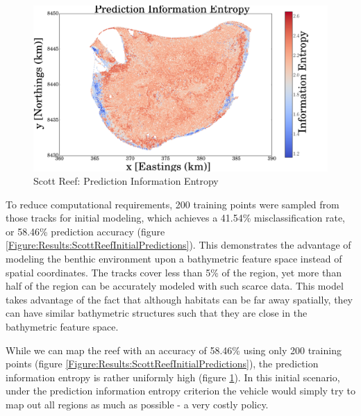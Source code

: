 \documentclass{article}
\begin{document}
		\begin{figure}[bp]
		\centering
			\includegraphics[width = \linewidth]{Figures/scott_reef_modeling/Figure9-eps-converted-to.png}
		\caption{Scott Reef: Prediction Information Entropy}
		\label{Figure:Results:ScottReefPredictionInformationEntropy}
		\end{figure}
				
		To reduce computational requirements, 200 training points were sampled from those tracks for initial modeling, which achieves a 41.54\% misclassification rate, or 58.46\% prediction accuracy (figure \ref{Figure:Results:ScottReefInitialPredictions}). This demonstrates the advantage of modeling the benthic environment upon a bathymetric feature space instead of spatial coordinates. The tracks cover less than 5\% of the region, yet more than half of the region can be accurately modeled with such scarce data. This model takes advantage of the fact that although habitats can be far away spatially, they can have similar bathymetric structures such that they are close in the bathymetric feature space.

		While we can map the reef with an accuracy of 58.46\% using only 200 training points (figure \ref{Figure:Results:ScottReefInitialPredictions}), the prediction information entropy is rather uniformly high (figure \ref{Figure:Results:ScottReefPredictionInformationEntropy}). In this initial scenario, under the prediction information entropy criterion the vehicle would simply try to map out all regions as much as possible - a very costly policy.
		
\end{document}
